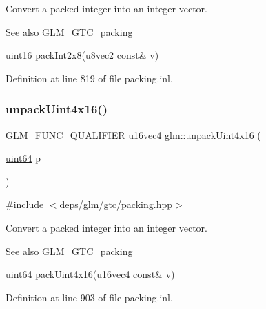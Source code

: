 Convert a packed integer into an integer vector.

\begin{DoxySeeAlso}{See also}
\hyperlink{group__gtc__packing}{G\+L\+M\+\_\+\+G\+T\+C\+\_\+packing} 

uint16 pack\+Int2x8(u8vec2 const\& v) 
\end{DoxySeeAlso}


Definition at line 819 of file packing.\+inl.

\mbox{\label{group__gtc__packing_gaf1eea82404af955004aae19a2dcb55f1}} 
\subsubsection{\texorpdfstring{unpack\+Uint4x16()}{unpackUint4x16()}}
{\footnotesize\ttfamily G\+L\+M\+\_\+\+F\+U\+N\+C\+\_\+\+Q\+U\+A\+L\+I\+F\+I\+ER \hyperlink{group__gtc__type__precision_ga049d45ad8d0f78578d7ceb86a7fdaae4}{u16vec4} glm\+::unpack\+Uint4x16 (\begin{DoxyParamCaption}\item[{\hyperlink{group__gtc__type__precision_gae3632bf9b37da66233d78930dd06378a}{uint64}}]{p }\end{DoxyParamCaption})}



{\ttfamily \#include $<$\hyperlink{gtc_2packing_8hpp}{deps/glm/gtc/packing.\+hpp}$>$}

Convert a packed integer into an integer vector.

\begin{DoxySeeAlso}{See also}
\hyperlink{group__gtc__packing}{G\+L\+M\+\_\+\+G\+T\+C\+\_\+packing} 

uint64 pack\+Uint4x16(u16vec4 const\& v) 
\end{DoxySeeAlso}


Definition at line 903 of file packing.\+inl.

\mbox{\label{group__gtc__packing_ga99229dc6cb31d82c39a324d5753792c6}} 
